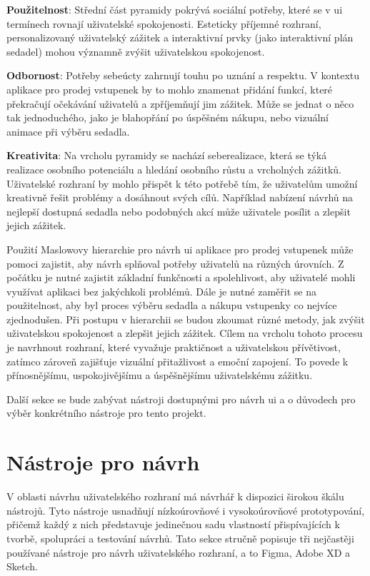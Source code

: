 \textbf{Použitelnost}: Střední část pyramidy pokrývá sociální potřeby, které se v \ac{ui} termínech rovnají uživatelské spokojenosti.
Esteticky příjemné rozhraní, personalizovaný uživatelský zážitek a interaktivní prvky (jako interaktivní plán sedadel) mohou významně zvýšit uživatelskou spokojenost.

\textbf{Odbornost}: Potřeby sebeúcty zahrnují touhu po uznání a respektu.
V kontextu aplikace pro prodej vstupenek by to mohlo znamenat přidání funkcí, které překračují očekávání uživatelů a zpříjemňují jim zážitek.
Může se jednat o něco tak jednoduchého, jako je blahopřání po úspěšném nákupu, nebo vizuální animace při výběru sedadla.

\textbf{Kreativita}: Na vrcholu pyramidy se nachází seberealizace, která se týká realizace osobního potenciálu a hledání osobního růstu a vrcholných zážitků.
Uživatelské rozhraní by mohlo přispět k této potřebě tím, že uživatelům umožní kreativně řešit problémy a dosáhnout svých cílů.
Například nabízení návrhů na nejlepší dostupná sedadla nebo podobných akcí může uživatele posílit a zlepšit jejich zážitek.

Použití Maslowovy hierarchie pro návrh \ac{ui} aplikace pro prodej vstupenek může pomoci zajistit, aby návrh splňoval potřeby uživatelů na různých úrovních.
Z počátku je nutné zajistit základní funkčnosti a spolehlivost, aby uživatelé mohli využívat aplikaci bez jakýchkoli problémů.
Dále je nutné zaměřit se na použitelnost, aby byl proces výběru sedadla a nákupu vstupenky co nejvíce zjednodušen.
Při postupu v hierarchii se budou zkoumat různé metody, jak zvýšit uživatelskou spokojenost a zlepšit jejich zážitek.
Cílem na vrcholu tohoto procesu je navrhnout rozhraní, které vyvažuje praktičnost a uživatelskou přívětivost, zatímco zároveň zajišťuje vizuální přitažlivost a emoční zapojení.
To povede k přínosnějšímu, uspokojivějšímu a úspěšnějšímu uživatelskému zážitku.

Další sekce se bude zabývat nástroji dostupnými pro návrh \ac{ui} a o důvodech pro výběr konkrétního nástroje pro tento projekt.

\section{Nástroje pro návrh}
\label{sec:navrh-ui-nastroje}
V oblasti návrhu uživatelského rozhraní má návrhář k dispozici širokou škálu nástrojů.
Tyto nástroje usnadňují nízkoúrovňové i vysokoúrovňové prototypování, přičemž každý z nich představuje jedinečnou sadu vlastností přispívajících k tvorbě, spolupráci a testování návrhů.
Tato sekce stručně popisuje tři nejčastěji používané nástroje pro návrh uživatelského rozhraní, a to Figma, Adobe XD a Sketch.

